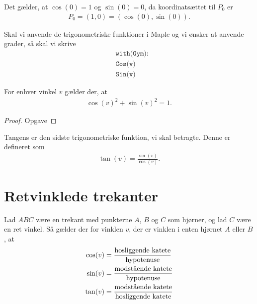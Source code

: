 \begin{exa}
Det gælder, at $\cos(0) = 1$ og $\sin(0)=0$, da koordinatsættet til $P_0$ er 
\begin{align*}
P_0 = (1,0) = (\cos(0),\sin(0)).
\end{align*}
\end{exa}

Skal vi anvende de trigonometriske funktioner i Maple og vi ønsker at anvende grader, så skal vi skrive
\begin{align*}
	&\texttt{with(Gym):} \\
	&\texttt{Cos(v)} \\	
	&\texttt{Sin(v)}
\end{align*}

\begin{setn}[Idiotformlen]
For enhver vinkel $v$ gælder der, at 
\begin{align*}
 \cos(v)^2 + \sin(v)^2 = 1.
\end{align*}
\end{setn}
\begin{proof}
Opgave
\end{proof}

Tangens er den sidste trigonometriske funktion, vi skal betragte. Denne er defineret som 
\begin{align*}
\tan(v) = \frac{\sin(v)}{\cos(v)}.
\end{align*}


\section*{Retvinklede trekanter}

\begin{setn}
Lad $ABC$ være en trekant med punkterne $A$,  $B$ og $C$ som hjørner, og lad $C$ være en ret vinkel. Så gælder der for vinklen $v$, der er vinklen i enten hjørnet $A$ eller $B$, at 
\begin{align*}
\cos(v) &= \frac{\textnormal{hosliggende katete}}{\textnormal{hypotenuse}}\\
\sin(v) &= \frac{\textnormal{modstående katete}}{\textnormal{hypotenuse}}\\
\tan(v) &= \frac{\textnormal{modstående katete}}{\textnormal{hosliggende katete}}
\end{align*}
\end{setn}

